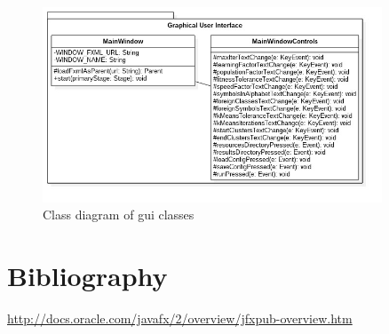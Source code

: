 \documentclass{article}
\begin{document}
\begin{figure}[H]
	\centering
	\includegraphics[width=0.9\textwidth]{images/gui.jpg}
    \caption{Class diagram of gui classes}
    \label{fig:gui_classes}
\end{figure}



\section{Bibliography}

\begin{thebibliography}{1}
	 \url{http://docs.oracle.com/javafx/2/overview/jfxpub-overview.htm}	
\end{thebibliography}
\end{document}
